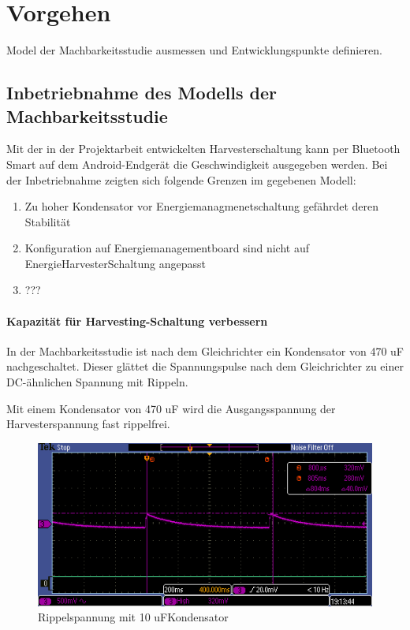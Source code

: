 \chapter{Vorgehen}
Model der Machbarkeitsstudie ausmessen und Entwicklungspunkte definieren.

\section{Inbetriebnahme des Modells der Machbarkeitsstudie}
Mit der in der Projektarbeit entwickelten Harvesterschaltung kann per Bluetooth Smart auf dem Android-Endgerät die Geschwindigkeit ausgegeben werden.
Bei der Inbetriebnahme zeigten sich folgende Grenzen im gegebenen Modell:

\begin{enumerate}
    \item Zu hoher Kondensator vor Energiemanagmenetschaltung gefährdet deren Stabilität
    \item Konfiguration auf Energiemanagementboard sind nicht auf EnergieHarvesterSchaltung angepasst
    \item ???
\end{enumerate}



\subsubsection{Kapazität für Harvesting-Schaltung verbessern}
In der Machbarkeitsstudie ist nach dem Gleichrichter ein Kondensator von 470 uF nachgeschaltet. Dieser glättet die Spannungspulse nach dem Gleichrichter zu einer DC-ähnlichen Spannung mit Rippeln.

Mit einem Kondensator von 470 uF wird die Ausgangsspannung der Harvesterspannung fast rippelfrei.
\begin{figure}
\includegraphics[bb = 0 0 100 100]{3Vorgehen/imag/10uF.PNG}
\caption{Rippelspannung mit 10 uFKondensator}
\end{figure}

